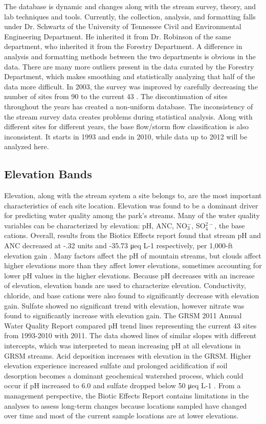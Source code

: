 The database is dynamic and changes along with the stream survey, theory,  and lab techniques and tools.
Currently, the collection, analysis, and formatting falls under Dr. Schwartz of the University of Tennessee Civil and Environmental Engineering Department.
He inherited it from Dr. Robinson of the same department, who inherited it from the Forestry Department.
A difference in analysis and formatting methods between the two departments is obvious in the data.
There are many more outliers present in the data curated by the Forestry Department, which makes smoothing and statistically analyzing that half of the data more difficult.
In 2003, the survey was improved by carefully decreasing the number of  sites from 90 to the current 43 \citep{odom2003}.
The discontinuation of sites throughout the years has created a non-uniform database.
The inconsistency of the stream survey data creates problems during statistical analysis.
Along with different sites for different years, the base flow/storm flow classification is also inconsistent.
It starts in 1993 and ends in 2010, while data up to 2012 will be analyzed here.

\subsection{Elevation Bands}

Elevation, along with the stream system a site belongs to, are the most important characteristics of each site location.
Elevation was found to be a dominant driver for predicting water quality among the park's streams. 
Many of the water quality variables can be characterized by elevation: pH, ANC, NO$_3^-$, SO$_4^{2-}$, the base cations.
Overall, results from the Biotics Effects report found that stream pH and ANC decreased at -.32 units and -35.73 μeq L-1 respectively, per 1,000-ft elevation gain \citep{cai2013}. 
Many factors affect the pH of mountain streams, but clouds affect higher elevations more than they affect lower elevations, sometimes accounting for lower pH values in the higher elevations.
Because pH decreases with an increase of elevation, elevation bands are used to characterize elevation.
Conductivity, chloride, and base cations were also found to significantly decrease with elevation gain.  
Sulfate showed no significant trend with elevation, however nitrate was found to significantly increase with elevation gain.  
The GRSM 2011 Annual Water Quality Report compared pH trend lines representing the current 43 sites from 1993-2010 with 2011.  
The data showed lines of similar slopes with different intercepts, which was interpreted to mean increasing pH at all elevations in GRSM streams.  
Acid deposition increases with elevation in the GRSM.
Higher elevation experience increased sulfate and prolonged acidification if soil desorption becomes a dominant geochemical watershed process, which could occur if pH increased to 6.0 and sulfate dropped below 50 μeq L-1 \citep{annualreport2012}.  
From a management perspective, the Biotic Effects Report contains limitations in the analyses to assess long-term changes because locations sampled have changed over time and most of the current sample locations are at lower elevations.

